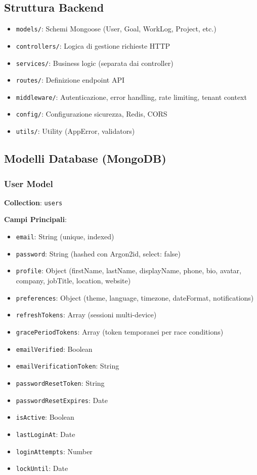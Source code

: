 \documentclass[11pt,a4paper]{article}
\begin{document}
\subsection{Struttura Backend}

\begin{itemize}
    \item \texttt{models/}: Schemi Mongoose (User, Goal, WorkLog, Project, etc.)
    \item \texttt{controllers/}: Logica di gestione richieste HTTP
    \item \texttt{services/}: Business logic (separata dai controller)
    \item \texttt{routes/}: Definizione endpoint API
    \item \texttt{middleware/}: Autenticazione, error handling, rate limiting, tenant context
    \item \texttt{config/}: Configurazione sicurezza, Redis, CORS
    \item \texttt{utils/}: Utility (AppError, validators)
\end{itemize}

\subsection{Modelli Database (MongoDB)}

\subsubsection{User Model}

\textbf{Collection}: \texttt{users}

\textbf{Campi Principali}:
\begin{itemize}
    \item \texttt{email}: String (unique, indexed)
    \item \texttt{password}: String (hashed con Argon2id, select: false)
    \item \texttt{profile}: Object (firstName, lastName, displayName, phone, bio, avatar, company, jobTitle, location, website)
    \item \texttt{preferences}: Object (theme, language, timezone, dateFormat, notifications)
    \item \texttt{refreshTokens}: Array (sessioni multi-device)
    \item \texttt{gracePeriodTokens}: Array (token temporanei per race conditions)
    \item \texttt{emailVerified}: Boolean
    \item \texttt{emailVerificationToken}: String
    \item \texttt{passwordResetToken}: String
    \item \texttt{passwordResetExpires}: Date
    \item \texttt{isActive}: Boolean
    \item \texttt{lastLoginAt}: Date
    \item \texttt{loginAttempts}: Number
    \item \texttt{lockUntil}: Date
\end{itemize}
\end{document}
